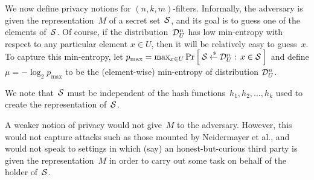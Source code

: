 


 We now define privacy notions for $(n,k,m)$-filters.  Informally, the adversary is given the representation~$M$ of a secret set~${\cal S}$, and its goal is to guess one of the elements of~${\cal S}$.  Of course, if the distribution~$\mathcal{D}_{U}^{n}$ has low min-entropy with respect to any particular element $x \in U$, then it will be relatively easy to guess~$x$.  To capture this min-entropy, let $p_{\mathrm{max}} = \max_{x \in U} \Pr\left[\: {\cal S} {\:\stackrel{{\scriptscriptstyle \hspace{0.2em}\$}} {\leftarrow}\:} \mathcal{D}_{U}^{n}:\, x \in {\cal S} \:\right]$ and define $\mu = -\log_2 p_{\mathrm{max}}$ to be the (element-wise) min-entropy of distribution $\mathcal{D}_{U}^{n}$.


We note that~${\cal S}$ must be independent of the hash functions~$h_1,h_2,\ldots,h_k$ used to create the representation of~${\cal S}$.  

A weaker notion of privacy would not give~$M$ to the adversary.  However, this would not capture attacks such as those mounted by Neidermayer et al.\cite{XXX}, and would not speak to settings in which (say) an honest-but-curious third party is given the representation~$M$ in order to carry out some task on behalf of the holder of~${\cal S}$.

